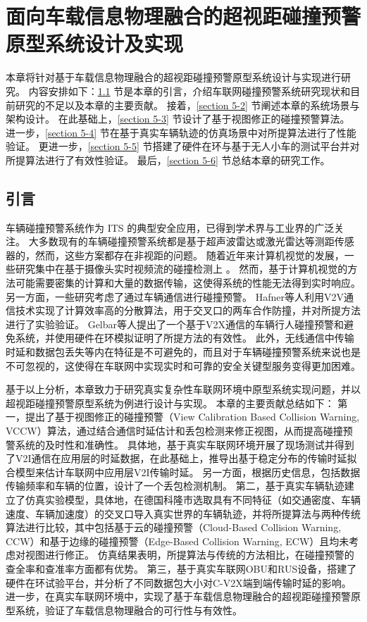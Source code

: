 \chapter{面向车载信息物理融合的超视距碰撞预警原型系统设计及实现}
本章将针对基于车载信息物理融合的超视距碰撞预警原型系统设计与实现进行研究。
内容安排如下：\ref{section 5-1} 节是本章的引言，介绍车联网碰撞预警系统研究现状和目前研究的不足以及本章的主要贡献。
接着，\ref{section 5-2} 节阐述本章的系统场景与架构设计。
在此基础上，\ref{section 5-3} 节设计了基于视图修正的碰撞预警算法。
进一步，\ref{section 5-4} 节在基于真实车辆轨迹的仿真场景中对所提算法进行了性能验证。
更进一步，\ref{section 5-5} 节搭建了硬件在环与基于无人小车的测试平台并对所提算法进行了有效性验证。
最后，\ref{section 5-6} 节总结本章的研究工作。

\section{引言}\label{section 5-1}

车辆碰撞预警系统作为 ITS 的典型安全应用，已得到学术界与工业界的广泛关注。
大多数现有的车辆碰撞预警系统都是基于超声波雷达或激光雷达等测距传感器的\cite{song2018real, wu2019series}，然而，这些方案都存在非视距的问题。
随着近年来计算机视觉的发展，一些研究集中在基于摄像头实时视频流的碰撞检测上 \cite{wang2016vision, song2018lane}。
然而，基于计算机视觉的方法可能需要密集的计算和大量的数据传输，这使得系统的性能无法得到实时响应。 
另一方面，一些研究考虑了通过车辆通信进行碰撞预警。
Hafner等人\cite{hafner2013cooperative}利用V2V通信技术实现了计算效率高的分散算法，用于交叉口的两车合作防撞，并对所提方法进行了实验验证。
Gelbar等人\cite{gelbal2017elastic}提出了一个基于V2X通信的车辆行人碰撞预警和避免系统，并使用硬件在环模拟证明了所提方法的有效性。
此外，无线通信中传输时延和数据包丢失等内在特征是不可避免的，而且对于车辆碰撞预警系统来说也是不可忽视的，这使得在车联网中实现实时和可靠的安全关键型服务变得更加困难。

基于以上分析，本章致力于研究真实复杂性车联网环境中原型系统实现问题，并以超视距碰撞预警原型系统为例进行设计与实现。
本章的主要贡献总结如下：
第一，提出了基于视图修正的碰撞预警（View Calibration Based Collision Warning, VCCW）算法，通过结合通信时延估计和丢包检测来修正视图，从而提高碰撞预警系统的及时性和准确性。
具体地，基于真实车联网环境开展了现场测试并得到了V2I通信在应用层的时延数据，在此基础上，推导出基于稳定分布的传输时延拟合模型来估计车联网中应用层V2I传输时延。
另一方面，根据历史信息，包括数据传输频率和车辆的位置，设计了一个丢包检测机制。
第二，基于真实车辆轨迹建立了仿真实验模型，具体地，在德国科隆市选取具有不同特征（如交通密度、车辆速度、车辆加速度）的交叉口导入真实世界的车辆轨迹，并将所提算法与两种传统算法进行比较，其中包括基于云的碰撞预警（Cloud-Based Collision Warning, CCW）和基于边缘的碰撞预警（Edge-Based Collision Warning, ECW）且均未考虑对视图进行修正。
仿真结果表明，所提算法与传统的方法相比，在碰撞预警的查全率和查准率方面都有优势。
第三，基于真实车联网OBU和RUS设备，搭建了硬件在环试验平台，并分析了不同数据包大小对C-V2X端到端传输时延的影响。
进一步，在真实车联网环境中，实现了基于车载信息物理融合的超视距碰撞预警原型系统，验证了车载信息物理融合的可行性与有效性。


